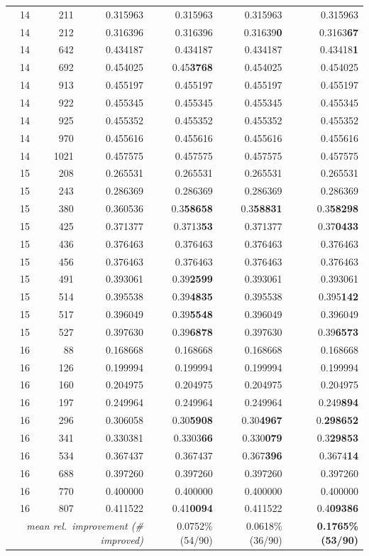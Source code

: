 \documentclass[10pt]{article}
\begin{document}
{\begin{longtable}{rrrrrr}
14 & 211 & 0.315963 & 0.315963 & 0.315963 & 0.315963 \\
14 & 212 & 0.316396 & 0.316396 & 0.31639\textbf{0} & 0.3163\textbf{67} \\
14 & 642 & 0.434187 & 0.434187 & 0.434187 & 0.43418\textbf{1} \\
14 & 692 & 0.454025 & 0.45\textbf{3768} & 0.454025 & 0.454025 \\
14 & 913 & 0.455197 & 0.455197 & 0.455197 & 0.455197 \\
14 & 922 & 0.455345 & 0.455345 & 0.455345 & 0.455345 \\
14 & 925 & 0.455352 & 0.455352 & 0.455352 & 0.455352 \\
14 & 970 & 0.455616 & 0.455616 & 0.455616 & 0.455616 \\
14 & 1021 & 0.457575 & 0.457575 & 0.457575 & 0.457575 \\
15 & 208 & 0.265531 & 0.265531 & 0.265531 & 0.265531 \\
15 & 243 & 0.286369 & 0.286369 & 0.286369 & 0.286369 \\
15 & 380 & 0.360536 & 0.3\textbf{58658} & 0.3\textbf{58831} & 0.3\textbf{58298} \\
15 & 425 & 0.371377 & 0.3713\textbf{53} & 0.371377 & 0.37\textbf{0433} \\
15 & 436 & 0.376463 & 0.376463 & 0.376463 & 0.376463 \\
15 & 456 & 0.376463 & 0.376463 & 0.376463 & 0.376463 \\
15 & 491 & 0.393061 & 0.39\textbf{2599} & 0.393061 & 0.393061 \\
15 & 514 & 0.395538 & 0.39\textbf{4835} & 0.395538 & 0.395\textbf{142} \\
15 & 517 & 0.396049 & 0.39\textbf{5548} & 0.396049 & 0.396049 \\
15 & 527 & 0.397630 & 0.39\textbf{6878} & 0.397630 & 0.39\textbf{6573} \\
16 & 88 & 0.168668 & 0.168668 & 0.168668 & 0.168668 \\
16 & 126 & 0.199994 & 0.199994 & 0.199994 & 0.199994 \\
16 & 160 & 0.204975 & 0.204975 & 0.204975 & 0.204975 \\
16 & 197 & 0.249964 & 0.249964 & 0.249964 & 0.249\textbf{894} \\
16 & 296 & 0.306058 & 0.30\textbf{5908} & 0.30\textbf{4967} & 0.\textbf{298652} \\
16 & 341 & 0.330381 & 0.3303\textbf{66} & 0.330\textbf{079} & 0.3\textbf{29853} \\
16 & 534 & 0.367437 & 0.367437 & 0.367\textbf{396} & 0.3674\textbf{14} \\
16 & 688 & 0.397260 & 0.397260 & 0.397260 & 0.397260 \\
16 & 770 & 0.400000 & 0.400000 & 0.400000 & 0.400000 \\
16 & 807 & 0.411522 & 0.41\textbf{0094} & 0.411522 & 0.4\textbf{09386} \\
\midrule
\multicolumn{3}{r}{\emph{mean rel.\ improvement (\# improved)}} & 0.0752\% (54/90) & 0.0618\% (36/90) & \textbf{0.1765\% (53/90)} \\
\bottomrule
\end{longtable}
}
\end{document}
